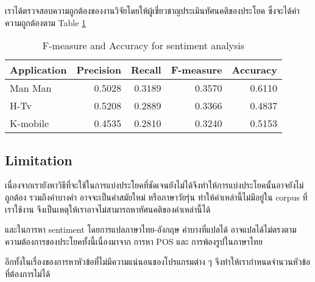 
เราได้ตรวจสอบความถูกต้องของงานวิจัยโดยให้ผู้เชี่ยวชาญประเมินทัศนคติของประโยค ซึ่งจะได้ค่าความถูกต้องตาม Table \ref{table:f-measureSenti}
\begin{table}
	\caption{F-measure and Accuracy for sentiment analysis}
	\label{table:f-measureSenti}
	\centering
	\begin{tabular}{|l|r|r|r|r|}
		\hline
		\multicolumn{1}{|c|}{Application} &
		\multicolumn{1}{|c|}{Precision}&
		\multicolumn{1}{|c|}{Recall}&
		\multicolumn{1}{|c|}{F-measure} &
		\multicolumn{1}{|c|}{Accuracy} \\
		\hline
		Man Man & 0.5028 & 0.3189 & 0.3570 & 0.6110\\
		\hline
		H-Tv & 0.5208 & 0.2889 & 0.3366 & 0.4837 \\
		\hline
		K-mobile & 0.4535 & 0.2810 & 0.3240 & 0.5153 \\
		\hline
	\end{tabular}
\end{table}
\subsection*{Limitation}
เนื่องจากเรายังหาวิธีที่จะใช้ในการแบ่งประโยคที่ชัดเจนยังไม่ได้จึงทำให้การแบ่งประโยคนั้นอาจยังไม่ถูกต้อง รวมถึงคำบางคำ อาจจะเป็นคำสมัยใหม่ หรือภาษาวัยรุ่น ทำให้คำเหล่านี้ไม่มีอยู่ใน corpus ที่เราใช้งาน จึงเป็นเหตุให้เราอาจไม่สามารถหาทัศนคติของคำเหล่านี้ได้

และในการหา sentiment โดยการแปลภาษาไทย-อังกฤษ คำบางที่แปลได้ อาจแปลได้ไม่ตรงตามความต้องการของประโยคทั้งนี้เนื่องมาจาก การหา POS และ การพ้องรูปในภาษาไทย

อีกทั้งในเรื่องของการหาหัวข้อที่ไม่มีความแน่นอนของโปรแกรมต่าง ๆ จึงทำให้เรากำหนดจำนวนหัวข้อที่ต้องการไม่ได้



%
%


